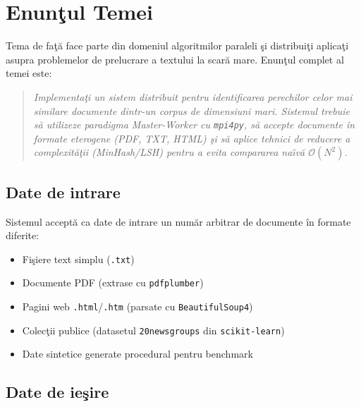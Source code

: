 \documentclass[a4paper,12pt]{report}
\begin{document}
\tableofcontents
\newpage

\chapter{Enun\c{t}ul Temei}

Tema de fa\c{t}\u{a} face parte din domeniul algoritmilor paraleli \c{s}i distribui\c{t}i aplica\c{t}i asupra problemelor de prelucrare a textului la scar\u{a} mare. Enun\c{t}ul complet al temei este:

\begin{quote}
\textit{Implementa\c{t}i un sistem distribuit pentru identificarea perechilor celor mai similare documente dintr-un corpus de dimensiuni mari. Sistemul trebuie s\u{a} utilizeze paradigma Master-Worker cu \texttt{mpi4py}, s\u{a} accepte documente \^{i}n formate eterogene (PDF, TXT, HTML) \c{s}i s\u{a} aplice tehnici de reducere a complexit\u{a}\c{t}ii (MinHash/LSH) pentru a evita compararea na\"{\i}v\u{a} $\mathcal{O}(N^2)$.}
\end{quote}

\section{Date de intrare}

Sistemul accept\u{a} ca date de intrare un num\u{a}r arbitrar de documente \^{i}n formate diferite:
\begin{itemize}
  \item Fi\c{s}iere text simplu (\texttt{.txt})
  \item Documente \ac{PDF} (extrase cu \texttt{pdfplumber})
  \item Pagini web \texttt{.html}/\texttt{.htm} (parsate cu \texttt{BeautifulSoup4})
  \item Colec\c{t}ii publice (datasetul \texttt{20newsgroups} din \texttt{scikit-learn})
  \item Date sintetice generate procedural pentru benchmark
\end{itemize}

\section{Date de ie\c{s}ire}
\end{document}
